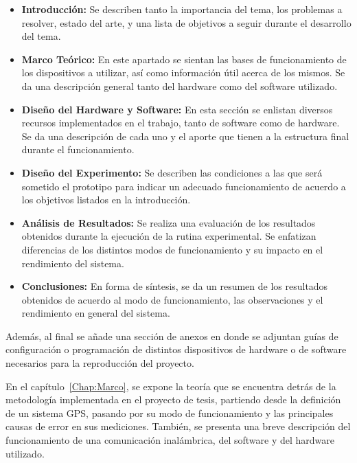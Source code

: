 \begin{itemize}
\item \textbf{Introducción:} Se describen tanto la importancia del tema, los problemas a resolver, estado del arte, y una lista de objetivos a seguir durante el desarrollo del tema.\\
\item \textbf{Marco Teórico:} En este apartado se sientan las bases de funcionamiento de los dispositivos a utilizar, así como información útil acerca de los mismos. Se da una descripción general tanto del hardware como del software utilizado.\\
\item \textbf{Diseño del Hardware y Software:} En esta sección se enlistan diversos recursos implementados en el trabajo, tanto de software como de hardware. Se da una descripción de cada uno y el aporte que tienen a la estructura final durante el funcionamiento.\\
\item \textbf{Diseño del Experimento:} Se describen las condiciones a las que será sometido el prototipo para indicar un adecuado funcionamiento de acuerdo a los objetivos listados en la introducción.\\
\item \textbf{Análisis de Resultados:} Se realiza una evaluación de los resultados obtenidos durante la ejecución de la rutina experimental. Se enfatizan diferencias de los distintos modos de funcionamiento y su impacto en el rendimiento del sistema.\\
\item \textbf{Conclusiones:} En forma de síntesis, se da un resumen de los resultados obtenidos de acuerdo al modo de funcionamiento, las observaciones  y el rendimiento en general del sistema.\\
\end{itemize}

Además, al final se añade una sección de anexos en donde se adjuntan guías de configuración o programación de distintos dispositivos de hardware o de software necesarios para la reproducción del proyecto.

En el capítulo~\ref{Chap:Marco}, se expone la teoría que se encuentra detrás de la metodología implementada en el proyecto de tesis, partiendo desde la definición de un sistema GPS, pasando por su modo de funcionamiento y las principales causas de error en sus mediciones. También, se presenta una breve descripción del funcionamiento de una comunicación inalámbrica, del software y del hardware utilizado.